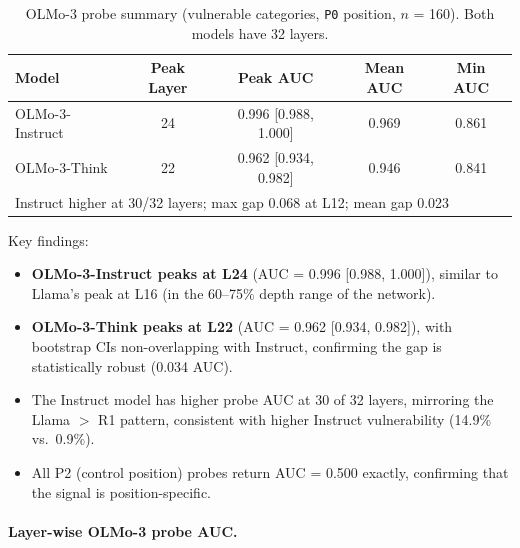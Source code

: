 \documentclass[accepted]{article}
\newcommand{\pzero}{\texttt{P0}}
\begin{document}
\begin{table}[ht]
\centering
\caption{OLMo-3 probe summary (vulnerable categories, \pzero{} position,
  $n$ = 160).  Both models have 32 layers.}
\label{tab:olmo_probe_summary}
\vspace{4pt}
\small
\begin{tabular}{lcccc}
\toprule
\textbf{Model} & \textbf{Peak Layer} & \textbf{Peak AUC} & \textbf{Mean AUC} & \textbf{Min AUC} \\
\midrule
OLMo-3-Instruct & 24 & 0.996 [0.988, 1.000] & 0.969 & 0.861 \\
OLMo-3-Think    & 22 & 0.962 [0.934, 0.982] & 0.946 & 0.841 \\
\midrule
\multicolumn{5}{l}{Instruct higher at 30/32 layers; max gap 0.068 at L12; mean gap 0.023} \\
\bottomrule
\end{tabular}
\end{table}

\noindent Key findings:
\begin{itemize}[leftmargin=*,itemsep=2pt]
  \item \textbf{OLMo-3-Instruct peaks at L24} (AUC = 0.996 [0.988, 1.000]),
  similar to Llama's peak at L16 (in the 60--75\% depth range of the network).
  \item \textbf{OLMo-3-Think peaks at L22} (AUC = 0.962 [0.934, 0.982]),
  with bootstrap CIs non-overlapping with Instruct, confirming the gap
  is statistically robust (0.034 AUC).
  \item The Instruct model has higher probe AUC at 30 of 32 layers,
  mirroring the Llama $>$ R1 pattern, consistent with higher Instruct
  vulnerability (14.9\% vs.\ 0.9\%).
  \item All P2 (control position) probes return AUC = 0.500 exactly,
  confirming that the signal is position-specific.
\end{itemize}

\paragraph{Layer-wise OLMo-3 probe AUC.}
\end{document}
